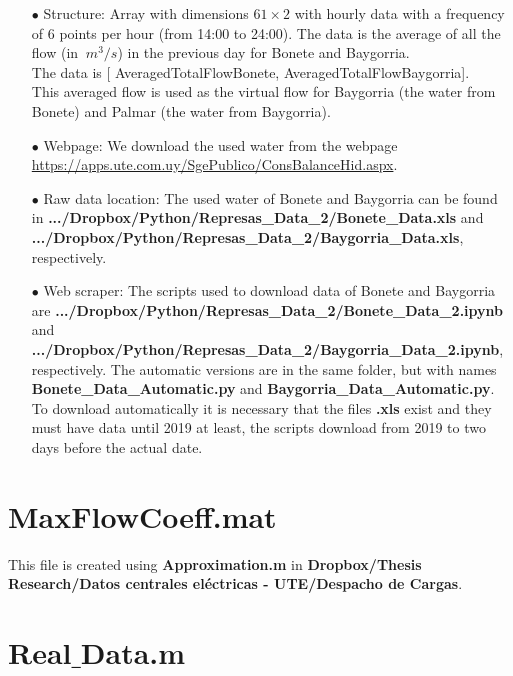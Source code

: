 \documentclass[12pt]{article}
\theoremstyle{definition}
\theoremstyle{remark}
\begin{document}
\begin{enumerate}

\item[$\bullet$] Structure: Array with dimensions $61\times2$ with hourly data with a frequency of 6 points per hour (from 14:00 to 24:00). The data is the average of all the flow (in $\SI{}{m^3/s}$) in the previous day for Bonete and Baygorria.\\
The data is [{\color{blue} AveragedTotalFlowBonete, AveragedTotalFlowBaygorria}].\\
This averaged flow is used as the virtual flow for Baygorria (the water from Bonete) and Palmar (the water from Baygorria).

\item[$\bullet$] Webpage: We download the used water from the webpage {\color{blue} \url{https://apps.ute.com.uy/SgePublico/ConsBalanceHid.aspx}}.

\item[$\bullet$] Raw data location: The used water of Bonete and Baygorria can be found in \textbf{.../Dropbox/Python/Represas\_Data\_2/Bonete\_Data.xls} and \textbf{.../Dropbox/Python/Represas\_Data\_2/Baygorria\_Data.xls}, respectively.

\item[$\bullet$] Web scraper: The scripts used to download data of Bonete and Baygorria are \textbf{.../Dropbox/Python/Represas\_Data\_2/Bonete\_Data\_2.ipynb} and \textbf{.../Dropbox/Python/Represas\_Data\_2/Baygorria\_Data\_2.ipynb}, respectively.  The automatic versions are in the same folder, but with names \textbf{Bonete\_Data\_Automatic.py} and \textbf{Baygorria\_Data\_Automatic.py}. To download automatically it is necessary that the files \textbf{.xls} exist and they must have data until 2019 at least, the scripts download from 2019 to two days before the actual date.

\end{enumerate}

\section{MaxFlowCoeff.mat}

This file is created using \textbf{Approximation.m} in \textbf{Dropbox/Thesis Research/Datos centrales eléctricas - UTE/Despacho de Cargas}.

\section{Real$\_$Data.m}
\end{document}
